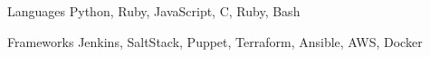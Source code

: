 
\begin{cvskills}
  \cvskill
    {Languages} %
    {Python, Ruby, JavaScript, C, Ruby, Bash} %

  \cvskill
    {Frameworks} %
    {Jenkins, SaltStack, Puppet, Terraform, Ansible, AWS, Docker} %
\end{cvskills}
